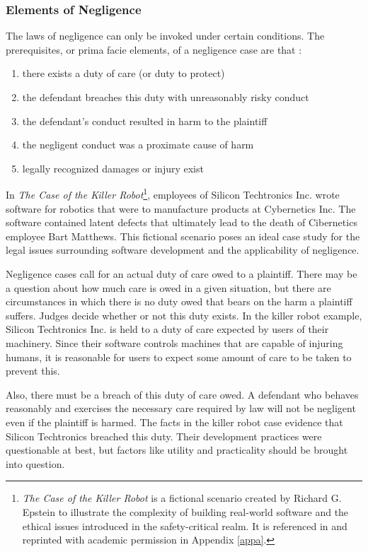 \documentclass[12pt]{report}
\begin{document}
\subsubsection{Elements of Negligence}
The laws of negligence can only be invoked under certain conditions. The prerequisites, or prima facie elements, of a negligence case are that \cite{Dobbs01}:
\singlespace
\begin{enumerate}
 \item there exists a duty of care (or duty to protect)
 \item the defendant breaches this duty with unreasonably risky conduct
 \item the defendant's conduct resulted in harm to the plaintiff
 \item the negligent conduct was a proximate cause of harm
 \item legally recognized damages or injury exist
\end{enumerate}
\doublespace
In \textit{The Case of the Killer Robot}\footnote{\textit{The Case of the Killer Robot} is a fictional scenario created by Richard G. Epstein to illustrate the complexity of building real-world software and the ethical issues introduced in the safety-critical realm. It is referenced in \cite{Epstein96} and reprinted with academic permission in Appendix \ref{appa}.}, employees of Silicon Techtronics Inc. wrote software for robotics that were to manufacture products at Cybernetics Inc. The software contained latent defects that ultimately lead to the death of Cibernetics employee Bart Matthews. This fictional scenario poses an ideal case study for the legal issues surrounding software development and the applicability of negligence.

Negligence cases call for an actual duty of care owed to a plaintiff. There may be a question about how much care is owed in a given situation, but there are circumstances in which there is no duty owed that bears on the harm a plaintiff suffers. Judges decide whether or not this duty exists. In the killer robot example, Silicon Techtronics Inc. is held to a duty of care expected by users of their machinery. Since their software controls machines that are capable of injuring humans, it is reasonable for users to expect some amount of care to be taken to prevent this.

Also, there must be a breach of this duty of care owed. A defendant who behaves reasonably and exercises the necessary care required by law will not be negligent even if the plaintiff is harmed. The facts in the killer robot case evidence that Silicon Techtronics breached this duty. Their development practices were questionable at best, but factors like utility and practicality should be brought into question.
\end{document}
